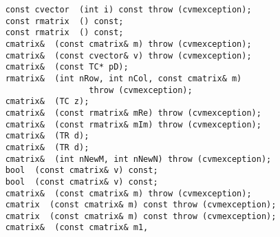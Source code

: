 \verb"    const cvector "\verb" (int i) const throw (cvmexception);"\\
\verb"    const rmatrix "\verb" () const;"\\
\verb"    const rmatrix "\verb" () const;"\\
\verb"    cmatrix& "\verb" (const cmatrix& m) throw (cvmexception);"\\
\verb"    cmatrix& "\verb" (const cvector& v) throw (cvmexception);"\\
\verb"    cmatrix& "\verb" (const TC* pD);"\\
\verb"    rmatrix& "\verb" (int nRow, int nCol, const cmatrix& m)"\\
\verb"                     throw (cvmexception);"\\
\verb"    cmatrix& "\verb" (TC z);"\\
\verb"    cmatrix& "\verb" (const rmatrix& mRe) throw (cvmexception);"\\
\verb"    cmatrix& "\verb" (const rmatrix& mIm) throw (cvmexception);"\\
\verb"    cmatrix& "\verb" (TR d);"\\
\verb"    cmatrix& "\verb" (TR d);"\\
\verb"    cmatrix& "\verb" (int nNewM, int nNewN) throw (cvmexception);"\\
\verb"    bool "\verb" (const cmatrix& v) const;"\\
\verb"    bool "\verb" (const cmatrix& v) const;"\\
\verb"    cmatrix& "\verb" (const cmatrix& m) throw (cvmexception);"\\
\verb"    cmatrix "\verb" (const cmatrix& m) const throw (cvmexception);"\\
\verb"    cmatrix "\verb" (const cmatrix& m) const throw (cvmexception);"\\
\verb"    cmatrix& "\verb" (const cmatrix& m1,"\\
